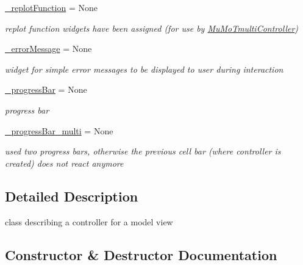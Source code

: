\begin{DoxyCompactItemize}
\hyperlink{class_mu_mo_t_1_1_mu_mo_tcontroller_a04e66f2b7e3c67b0e96f318acbfa7f0e}{\+\_\+replot\+Function} = None
\begin{DoxyCompactList}\small\item\em replot function widgets have been assigned (for use by \hyperlink{class_mu_mo_t_1_1_mu_mo_tmulti_controller}{Mu\+Mo\+Tmulti\+Controller}) \end{DoxyCompactList}\item 
\hyperlink{class_mu_mo_t_1_1_mu_mo_tcontroller_afb9cc1f1f0c08393b454f526842425cc}{\+\_\+error\+Message} = None
\begin{DoxyCompactList}\small\item\em widget for simple error messages to be displayed to user during interaction \end{DoxyCompactList}\item 
\hyperlink{class_mu_mo_t_1_1_mu_mo_tcontroller_a018864aa22d2adb0d3958fb0adbce8e2}{\+\_\+progress\+Bar} = None
\begin{DoxyCompactList}\small\item\em progress bar \end{DoxyCompactList}\item 
\hyperlink{class_mu_mo_t_1_1_mu_mo_tcontroller_a1da52cde6b2b94a1005eaa6898d2f8c5}{\+\_\+progress\+Bar\+\_\+multi} = None
\begin{DoxyCompactList}\small\item\em used two progress bars, otherwise the previous cell bar (where controller is created) does not react anymore \end{DoxyCompactList}\end{DoxyCompactItemize}


\subsection{Detailed Description}
class describing a controller for a model view 

\subsection{Constructor \& Destructor Documentation}
\mbox{\label{class_mu_mo_t_1_1_mu_mo_tcontroller_a833cd489e067743a190b434eea451095}} 
